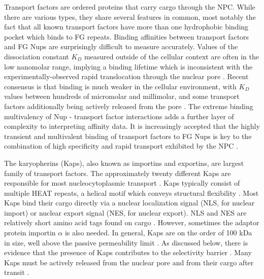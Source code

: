Transport factors are ordered proteins that carry cargo through the NPC.  While there are various types, they share several features in common, most notably the fact that all known transport factors have more than one hydrophobic binding pocket which binds to FG repeats.  Binding affinities between transport factors and FG Nups are surprisingly difficult to measure accurately.  Values of the dissociation constant $K_D$ measured outside of the cellular context are often in the low nanomolar range, implying a binding lifetime which is inconsistent with the experimentally-observed rapid translocation through the nuclear pore \cite{pyhtila03, gilchrist02}.  Recent consensus is that binding is much weaker in the cellular environment, with $K_D$ values between hundreds of micromolar and millimolar, and some transport factors additionally being actively released from the pore \cite{tetenbaum-novatt12-1, milles15, hayama18}.  The extreme binding multivalency of Nup - transport factor interactions adds a further layer of complexity to interpreting affinity data.  It is increasingly accepted that the highly transient and multivalent binding of transport factors to FG Nups is key to the combination of high specificity and rapid transport exhibited by the NPC \cite{jovanovic-talisman17}.

The karyopherins (Kaps), also known as importins and exportins, are largest family of transport factors.  The approximately twenty different Kaps are responsible for most nucleocytoplasmic transport \cite{kapinos17}. Kaps typically consist of multiple HEAT repeats, a helical motif which conveys structural flexibility \cite{yoshimura16}.  Most Kaps bind their cargo directly via a nuclear localization signal (NLS, for nuclear import) or nuclear export signal (NES, for nuclear export).  NLS and NES are relatively short amino acid tags found on cargo \cite{chook11}.  However, sometimes the adaptor protein importin $\alpha$ is also needed.    In general, Kaps are on the order of 100 kDa in size, well above the passive permeability limit \cite{timney16}.   As discussed below, there is evidence that the presence of Kaps contributes to the selectivity barrier \cite{kapinos18,kapinos17,schleicher14, kapinos14}.  Many Kaps must be actively released from the nuclear pore and from their cargo after transit \cite{gorlich96,stewart07}.


